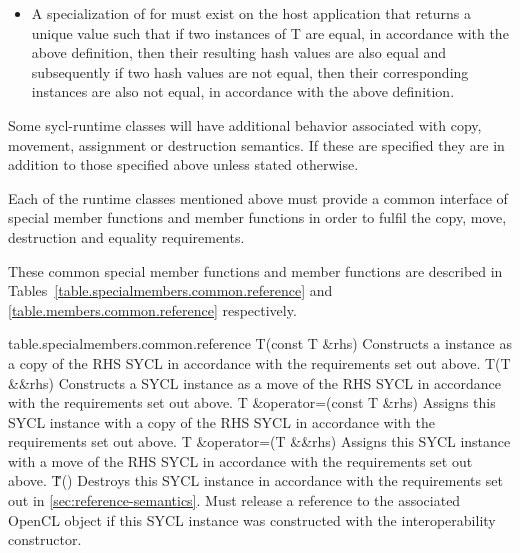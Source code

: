 \begin{itemize}
\item A specialization of  for  must exist on the host application that returns a unique value such that if two instances of T are equal, in accordance with the above definition, then their resulting hash values are also equal and subsequently if two hash values are not equal, then their corresponding instances are also not equal, in accordance with the above definition.

\end{itemize}

Some \gls{sycl-runtime} classes will have additional behavior associated with copy, movement, assignment or destruction semantics. If these are specified they are in addition to those specified above unless stated otherwise.

Each of the runtime classes mentioned above must provide a common interface of special member functions and member functions in order to fulfil the copy, move, destruction and equality requirements.

These common special member functions and member functions are described in Tables~\ref{table.specialmembers.common.reference} and \ref{table.members.common.reference} respectively.



{table.specialmembers.common.reference}
  \addRow
    {T(const T \&rhs)}
    {
      Constructs a  instance as a copy of the RHS SYCL  in accordance with the requirements set out above.
    }
  \addRow
    {T(T \&\&rhs)}
    {
      Constructs a SYCL  instance as a move of the RHS SYCL  in accordance with the requirements set out above.
    }  
   \addRow
   {T \&operator=(const T \&rhs)}
   {
     Assigns this SYCL  instance with a copy of the RHS SYCL  in accordance with the requirements set out above.
   }
   \addRow
   {T \&operator=(T \&\&rhs)}
   {
     Assigns this SYCL  instance with a move of the RHS SYCL  in accordance with the requirements set out above.
   }
   \addRow
   {\~T()}
   {
     Destroys this SYCL  instance in accordance with the requirements set out in \ref{sec:reference-semantics}.
     Must release a reference to the associated OpenCL object if this SYCL  instance was constructed with the interoperability constructor.
   }
\completeTable


